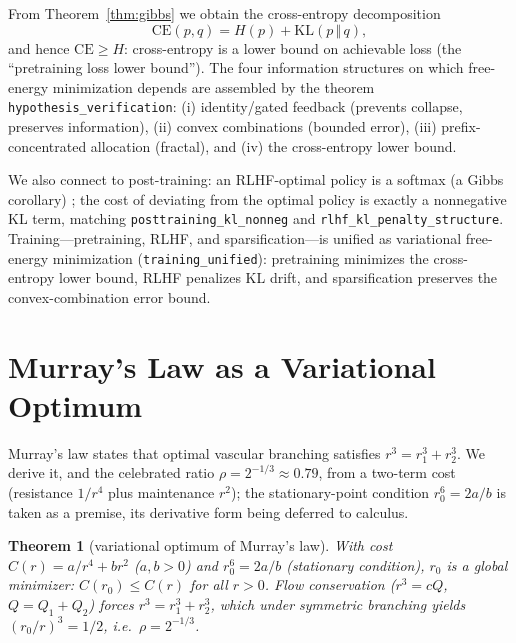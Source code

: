 \documentclass[journal]{IEEEtran}
\newtheorem{theorem}{Theorem}
\begin{document}
From Theorem~\ref{thm:gibbs} we obtain the cross-entropy decomposition
\begin{equation}
\mathrm{CE}(p,q)=H(p)+\mathrm{KL}(p\,\Vert\,q),
\label{eq:ce}
\end{equation}
and hence $\mathrm{CE}\ge H$: cross-entropy is a lower bound on achievable loss
(the ``pretraining loss lower bound''). The four information structures on which
free-energy minimization depends are assembled by the theorem
\texttt{hypothesis\_verification}: (i) identity/gated feedback (prevents
collapse, preserves information), (ii) convex combinations (bounded error),
(iii) prefix-concentrated allocation (fractal), and (iv) the cross-entropy lower
bound.

We also connect to post-training: an RLHF-optimal policy is a softmax
(a Gibbs corollary) \cite{schulman2017,rafailov2023dpo}; the cost of deviating
from the optimal policy is exactly a nonnegative KL term, matching
\texttt{posttraining\_kl\_nonneg} and \texttt{rlhf\_kl\_penalty\_structure}.
Training---pretraining, RLHF, and sparsification---is unified as variational
free-energy minimization (\texttt{training\_unified}): pretraining minimizes
the cross-entropy lower bound, RLHF penalizes KL drift, and sparsification
preserves the convex-combination error bound.

\section{Murray's Law as a Variational Optimum}
\label{sec:murray}
Murray's law states that optimal vascular branching satisfies
$r^3=r_1^3+r_2^3$. We derive it, and the celebrated ratio
$\rho=2^{-1/3}\approx0.79$, from a two-term cost (resistance $1/r^4$ plus
maintenance $r^2$); the stationary-point condition $r_0^6=2a/b$ is taken as a
premise, its derivative form being deferred to calculus.

\begin{theorem}[variational optimum of Murray's law]
\label{thm:murray}
With cost $C(r)=a/r^4+br^2$ ($a,b>0$) and $r_0^6=2a/b$ (stationary condition),
$r_0$ is a global minimizer: $C(r_0)\le C(r)$ for all $r>0$. Flow
conservation ($r^3=cQ$, $Q=Q_1+Q_2$) forces $r^3=r_1^3+r_2^3$, which under
symmetric branching yields
$(r_0/r)^3=1/2$, i.e.\ $\rho=2^{-1/3}$.
\end{theorem}
\end{document}
